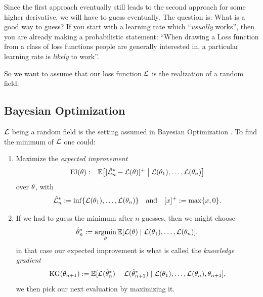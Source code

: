 Since the first approach eventually still leads to the second approach for some
higher derivative, we will have to guess eventually. The question is: What is
a good way to guess? If you start with a learning rate which ``\emph{usually}
works'', then you are already making a probabilistic statement: ``When drawing a
Loss function from a class of loss functions people are generally interested in,
a particular learning rate is \emph{likely} to work''.

So we want to assume that our loss function \(\mathcal{L}\) is the realization of a
random field.

\subsection{Bayesian Optimization}

\(\mathcal{L}\) being a random field is the setting assumed in Bayesian Optimization
\parencite[e.g.][]{frazierBayesianOptimization2018}. To find the minimum
of \(\mathcal{L}\) one could:

\begin{enumerate}
	\item Maximize the \emph{expected improvement} 
	\begin{equation}\label{eq: expected improvement}
		\operatorname{EI}(\theta) := \mathbb{E}\big[
			[\hat{\mathcal{L}}_n^*- \mathcal{L}(\theta)]^+
			\bigm|
			\mathcal{L}(\theta_1),\dots, \mathcal{L}(\theta_n)
		\big]
	\end{equation}
	over \(\theta\), with
	\begin{equation*}
		\hat{\mathcal{L}}_n^* := \inf\{\mathcal{L}(\theta_1),\dots, \mathcal{L}(\theta_n)\}
		\quad \text{and} \quad
		[x]^+ := \max\{x, 0\}.
	\end{equation*}

	\item If we had to guess the minimum after \(n\) guesses, then we might
	choose
	\begin{equation*}
		\hat{\theta}^*_n
		:= \operatorname*{argmin}_{\theta} \mathbb{E}[\mathcal{L}(\theta)\mid \mathcal{L}(\theta_1), \dots, \mathcal{L}(\theta_n)].
	\end{equation*}
	in that case our expected improvement is what is called the \emph{knowledge gradient}
	\begin{equation*}
		\operatorname{KG}(\theta_{n+1}) := \mathbb{E}[
			\mathcal{L}(\hat{\theta}^*_n) - \mathcal{L}(\hat{\theta}^*_{n+1})
			\mid \mathcal{L}(\theta_1), \dots, \mathcal{L}(\theta_n), \theta_{n+1}
		],
	\end{equation*}
	we then pick our next evaluation by maximizing it.	
\end{enumerate}

